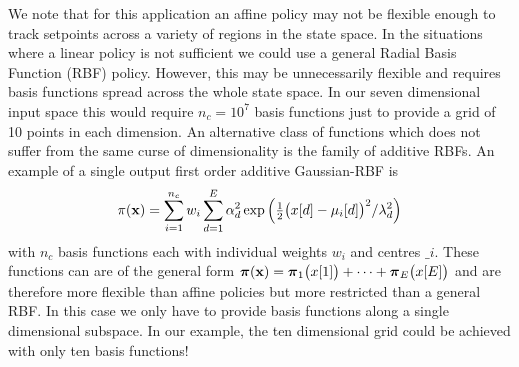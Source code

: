 We note that for this application an affine policy may not be flexible enough to track setpoints across a variety of regions in the state space. In the situations where a linear policy is not sufficient we could use a general Radial Basis Function (RBF) policy. However, this may be unnecessarily flexible and requires basis functions spread across the whole state space. In our seven dimensional input space this would require $n_c = 10^7$ basis functions just to provide a grid of 10 points in each dimension. An alternative class of functions which does not suffer from the same curse of dimensionality is the family of additive RBFs. An example of a single output first order additive Gaussian-RBF is
\begin{equation}
\pi(\mathbf{x}) = \sum_{i=1}^{n_c} w_i \sum_{d=1}^{E} \alpha_{d}^2
\exp\Big( \tfrac{1}{2} \big(x[d] - \mu_{i}[d]\big)^2/\lambda_d^2 \Big)
\end{equation}
with $n_c$ basis functions each with individual weights $w_i$ and centres $\bm_i$.
These functions can are of the general form $\boldsymbol{\pi}(\mathbf{x}) = \boldsymbol{\pi}_1\big(x[1]\big) + \dots + \boldsymbol{\pi}_E\big(x[E]\big)$ and are therefore more flexible than affine policies but more restricted than a general RBF. In this case we only have to provide basis functions along a single dimensional subspace. In our example, the ten dimensional grid could be achieved with only ten basis functions!


